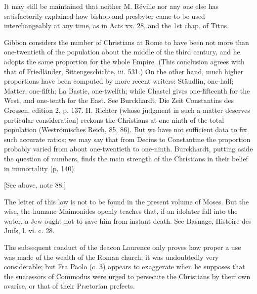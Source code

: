 It may still be maintained that neither M. Réville nor any one else has satisfactorily explained how bishop and presbyter came to be used interchangeably at any time, as in Acts xx. 28, and the 1st chap. of Titus.


Gibbon considers the number of Christians at Rome to have been not more than one-twentieth of the population about the middle of the third century, and he adopts the same proportion for the whole Empire. (This conclusion agrees with that of Friedländer, Sittengeschichte, iii. 531.) On the other hand, much higher proportions have been computed by more recent writers: Stäudlin, one-half; Matter, one-fifth; La Bastie, one-twelfth; while Chastel gives one-fifteenth for the West, and one-tenth for the East. See Burckhardt, Die Zeit Constantins des Grossen, edition 2, p. 137. H. Richter (whose judgment in such a matter deserves particular consideration) reckons the Christians at one-ninth of the total population (Weströmisches Reich, 85, 86). But we have not sufficient data to fix such accurate ratios; we may say that from Decius to Constantine the proportion probably varied from about one-twentieth to one-ninth. Burckhardt, putting aside the question of numbers, finds the main strength of the Christians in their belief in immortality (p. 140).

[See above, note 88.]

The letter of this law is not to be found in the present volume of Moses. But the wise, the humane Maimonides openly teaches that, if an idolater fall into the water, a Jew ought not to save him from instant death. See Basnage, Histoire des Juifs, l. vi. c. 28.

The subsequent conduct of the deacon Laurence only proves how proper a use was made of the wealth of the Roman church; it was undoubtedly very considerable; but Fra Paolo (c. 3) appears to exaggerate when he supposes that the successors of Commodus were urged to persecute the Christians by their own avarice, or that of their Prætorian prefects.
